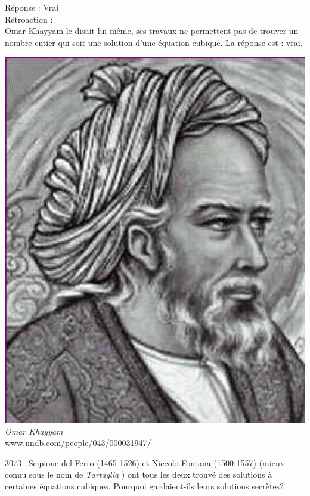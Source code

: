 \documentclass[letterpaper, 12pt]{article}
\begin{document}
R\'eponse : Vrai\\

R\'etroaction :\\
Omar Khayyam le disait lui-m\^eme, ses travaux ne permettent pas de trouver un nombre entier qui soit une solution d'une \'equation cubique. La r\'eponse est : vrai.
\begin{center}
\includegraphics[scale=0.3]{Omar_Khayyam.eps}\\
\emph{{\small Omar Khayyam}}\\
\href{http://www.nndb.com/people/043/000031947/}{www.nndb.com/people/043/000031947/}\\[5mm]
\end{center}



3073-- Scipione del Ferro (1465-1526) et Niccolo Fontana (1500-1557) (mieux connu sous le nom de \og \emph{Tartaglia} \fg) ont tous les deux trouv\'e des solutions \`a certaines \'equations cubiques. Pourquoi gardaient-ils leurs solutions secr\`etes?\\
\end{document}
